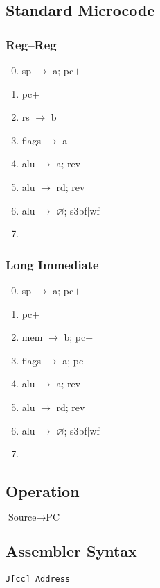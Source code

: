 \documentclass[11pt]{book}
\newcommand*{\instruction}[2][]{%
  \clearpage
  \thispagestyle{fancy}%
  \fancyhf[HL,HR]{\huge{#2}}%
  \fancyhf[HC]{#1}\addtocounter{section}{1}\noindent
}
\let\emptyset\varnothing
\begin{document}
\subsection*{Standard Microcode}
\begin{multicols}{2}\ttfamily\selectfont\small
  \subsubsection*{Reg--Reg}
  \begin{enumerate}\setcounter{enumi}{-1}
  \item sp \(\rightarrow\) a; pc\(+\)
  \item pc\(+\)
  \item rs \(\rightarrow\) b
  \item flags \(\rightarrow\) a
  \item alu \(\rightarrow\) a; rev
  \item alu \(\rightarrow\) rd; rev
  \item alu \(\rightarrow\) \(\emptyset\); s3bf|wf
  \item --
  \end{enumerate}
  \columnbreak
  \subsubsection*{Long Immediate}
  \begin{enumerate}\setcounter{enumi}{-1}
  \item sp \(\rightarrow\) a; pc\(+\)
  \item pc\(+\)
  \item mem \(\rightarrow\) b; pc\(+\)
  \item flags \(\rightarrow\) a; pc\(+\)
  \item alu \(\rightarrow\) a; rev
  \item alu \(\rightarrow\) rd; rev
  \item alu \(\rightarrow\) \(\emptyset\); s3bf|wf
  \item --
  \end{enumerate}
\end{multicols}


\instruction[Jump]{J}
\subsection*{Operation}
\(\text{Source}\rightarrow\text{PC}\)

\subsection*{Assembler Syntax}
\texttt{J[cc] Address}
\end{document}
